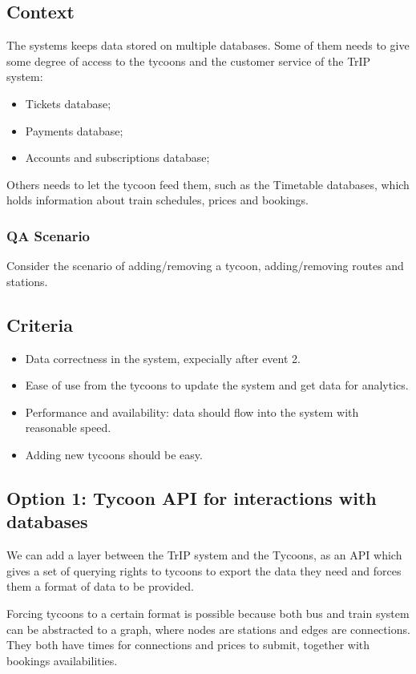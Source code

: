 \subsection*{Context}
The systems keeps data stored on multiple databases. 
Some of them needs to give some degree of access to the tycoons and the customer service of the TrIP system:
\begin{itemize}
    \item Tickets database;
    \item Payments database;
    \item Accounts and subscriptions database;
\end{itemize}

Others needs to let the tycoon feed them, such as the Timetable databases, which holds information about train schedules,
prices and bookings.

\subsubsection*{QA Scenario} %
Consider the scenario of adding/removing a tycoon, adding/removing routes and stations.
\subsection*{Criteria}
\begin{itemize}
    \item Data correctness in the system, expecially after event 2.
    \item Ease of use from the tycoons to update the system and get data for analytics.
    \item Performance and availability: data should flow into the system with reasonable speed.
    \item Adding new tycoons should be easy.
\end{itemize}

\subsection*{Option 1: Tycoon API for interactions with databases}

We can add a layer between the TrIP system and the Tycoons, as an API which gives a set of querying rights to tycoons to export the data they need and forces them a format of data to be provided.

Forcing tycoons to a certain format is possible because both bus and train system can be abstracted to a graph, where nodes are stations and edges are connections.
They both have times for connections and prices to submit, together with bookings availabilities.
